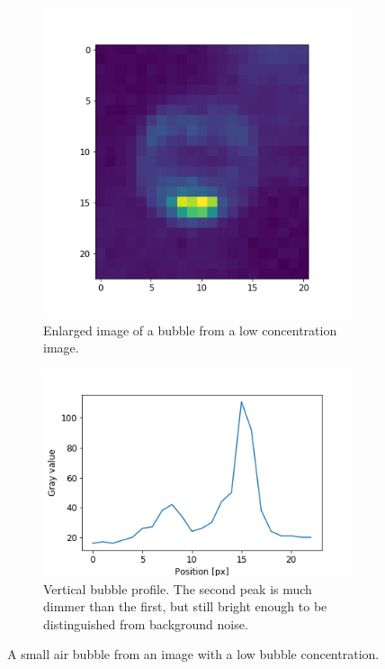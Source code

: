 		
		\begin{figure}
			\begin{subfigure}[t]{.3\textwidth}
				\centering
				\includegraphics[scale=.5]{images/one_peaks_color.png}
				\caption{Enlarged image of a bubble from a low concentration image. }
			\end{subfigure}\hfill
			\begin{subfigure}[t]{.4\textwidth}
				\includegraphics[scale=.5]{graphs/one_peaks_profile.png}
				\caption{Vertical bubble profile. The second peak is much dimmer than the first, but still bright enough to be distinguished from background noise.}
			\end{subfigure}
			\caption{A small air bubble from an image with a low bubble concentration.}
			\label{fig:bubble_profile}
		\end{figure}
		
